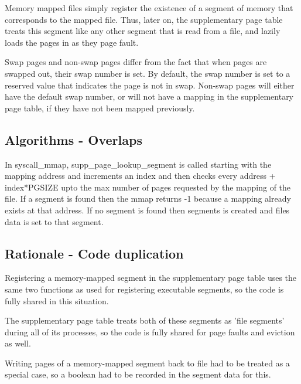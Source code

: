 Memory mapped files simply register the existence of a segment of memory that
corresponds to the mapped file. Thus, later on, the supplementary page table treats
this segment like any other segment that is read from a file, and lazily loads
the pages in as they page fault.

Swap pages and non-swap pages differ from the fact that when pages are swapped
out, their swap number is set. By default, the swap number is set to a reserved
value that indicates the page is not in swap. Non-swap pages will either have
the default swap number, or will not have a mapping in the supplementary page
table, if they have not been mapped previously.

\subsection{Algorithms - Overlaps}


In syscall\_mmap, supp\_page\_lookup\_segment is called starting with the mapping address and increments an index and then checks every address + index*PGSIZE upto the max number of pages requested by the mapping of the file. If a segment is found then the mmap returns -1 because a mapping already exists at that address. If no segment is found then segments is created and files data is set to that segment.

\subsection{Rationale - Code duplication}


Registering a memory-mapped segment in the supplementary page table uses the
same two functions as used for registering executable segments, so the code is
fully shared in this situation.

The supplementary page table treats both of these segments as 'file segments'
during all of its processes, so the code is fully shared for page faults and
eviction as well.

Writing pages of a memory-mapped segment back to file had to be treated as a
special case, so a boolean had to be recorded in the segment data for this.
